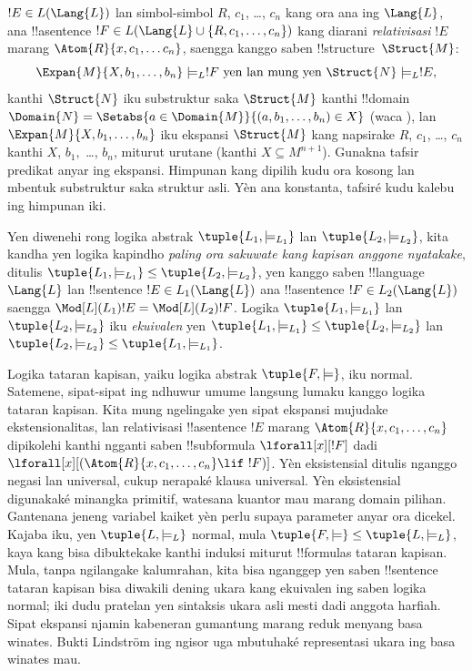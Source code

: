 \documentclass[../../../include/open-logic-section]{subfiles}
\begin{document}
\begin{defn}
\begin{enumerate}
  $!E \in L(\Lang{L})$ lan simbol-simbol $R$, $c_1$, \dots,
  $c_n$ kang ora ana ing $\Lang{L}$, ana !!a{sentence}
  $!F \in L(\Lang{L} \cup \{R,c_1,\ldots,c_n\})$
  kang diarani \emph{relativisasi} $!E$ marang
  $\Atom{R}{x, c_1, \dots c_n}$, saengga kanggo saben
  !!{structure}~$\Struct{M}$:
  \[
  \Expan{M}{X, b_1, \ldots, b_n} \models_L !F \text{ yen lan
    mung yen } \Struct{N} \models_L !E,
  \]
  kanthi $\Struct{N}$ iku substruktur saka $\Struct{M}$ kanthi
  !!{domain} $\Domain{N} = \Setabs{a\in \Domain{M}}{(a,
  b_1, \dots, b_n) \in X}$ (waca
  ), lan
  $\Expan{M}{X, b_1, \ldots, b_n}$ iku ekspansi $\Struct{M}$
  kang napsirake $R$, $c_1$, \dots, $c_n$ kanthi $X$, $b_1,$
  \dots, $b_n$, miturut urutane (kanthi $X \subseteq M^{n+1}$). Gunakna tafsir predikat anyar ing ekspansi. Himpunan kang dipilih kudu ora kosong lan mbentuk substruktur saka struktur asli. Yèn ana konstanta, tafsiré kudu kalebu ing himpunan iki.
\end{enumerate}
\end{defn}

\begin{defn}
Yen diwenehi rong logika abstrak $\tuple{L_1, \models_{L_1}}$
lan $\tuple{L_2, \models_{L_2}}$, kita kandha yen logika kapindho
\emph{paling ora sakuwate kang kapisan anggone nyatakake},
ditulis $\tuple{L_1, \models_{L_1}} \leq
\tuple{L_2, \models_{L_2}}$, yen kanggo saben !!{language}
$\Lang{L}$ lan !!{sentence} $!E \in L_1(\Lang{L})$ ana
!!a{sentence} $!F \in L_2(\Lang{L})$ saengga
$\Mod[L](L_1){!E} = \Mod[L](L_2){!F}$. Logika
$\tuple{L_1, \models_{L_1}}$ lan
$\tuple{L_2, \models_{L_2}}$ iku \emph{ekuivalen} yen
$\tuple{L_1, \models_{L_1}} \leq \tuple{L_2,
  \models_{L_2}}$ lan $\tuple{L_2, \models_{L_2}} \leq
\tuple{L_1, \models_{L_1}}$.
\end{defn}

\begin{rem}
  Logika tataran kapisan, yaiku logika abstrak $\tuple{F, \models}$,
  iku normal. Satemene, sipat-sipat ing ndhuwur umume langsung
  lumaku kanggo logika tataran kapisan. Kita mung ngelingake yen
  sipat ekspansi mujudake ekstensionalitas, lan relativisasi
  !!a{sentence} $!E$ marang $\Atom{R}{x, c_1, \dots, c_n}$
  dipikolehi kanthi ngganti saben !!{subformula}
  $\lforall[x][!F]$ dadi
  $\lforall[x][(\Atom{R}{x, c_1, \dots, c_n} \lif \ !F)]$. Yèn eksistensial ditulis nganggo negasi lan universal, cukup nerapaké klausa universal. Yèn eksistensial digunakaké minangka primitif, watesana kuantor mau marang domain pilihan. Gantenana jeneng variabel kaiket yèn perlu supaya parameter anyar ora dicekel.
  Kajaba iku, yen $\tuple{L, \models_L}$ normal, mula
  $\tuple{F, \models} \leq \tuple{L, \models_{L}}$,
  kaya kang bisa dibuktekake kanthi induksi miturut
  !!{formula}s tataran kapisan. Mula, tanpa ngilangake kalumrahan,
  kita bisa nganggep yen saben !!{sentence} tataran kapisan
  bisa diwakili dening ukara kang ekuivalen ing saben logika normal; iki dudu pratelan yen sintaksis ukara asli mesti dadi anggota harfiah. Sipat ekspansi njamin kabeneran gumantung marang reduk menyang basa winates. Bukti Lindstr\"om ing ngisor uga mbutuhaké representasi ukara ing basa winates mau.
\end{rem}
\end{document}
